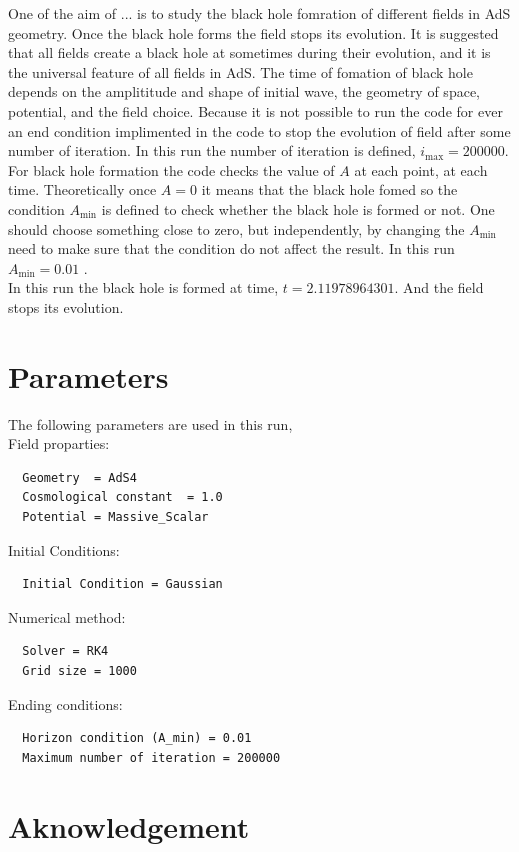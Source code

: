 \documentclass[12pt]{article}
\begin{document}
One of the aim of ... is to study the black hole fomration of different fields in AdS geometry. Once the black hole forms the field stops its evolution. It is suggested that all fields create a black hole at sometimes during their evolution, and it is the universal feature of all fields in AdS. The time of fomation of black hole depends on the amplititude and shape of initial wave, the geometry of space, potential, and the field choice. Because it is not possible to run the code for ever an end condition implimented in the code to stop the evolution of field after some number of iteration. In this run the number of iteration is defined, $i_{\max}  = 200000$. \\
For black hole formation the code checks the value of $A$ at each point, at each time. Theoretically once $A = 0$ it means that the black hole fomed so the condition $A_{\min}$ is defined to check whether the black hole is formed or not. One should choose something close to zero, but independently, by changing the $A_{\min}$ need to make sure that the condition do not affect the result. In this run $A_{\min} = 0.01$ . \\
 In this run the black hole is formed at time, $ t = 2.11978964301$. And the field stops its evolution. 
\section{Parameters}

The following parameters are used in this run, \\

Field proparties:
\begin{verbatim}
  Geometry  = AdS4
  Cosmological constant  = 1.0
  Potential = Massive_Scalar
\end{verbatim}

Initial Conditions:
\begin{verbatim}
  Initial Condition = Gaussian
\end{verbatim}

Numerical method:
\begin{verbatim}
  Solver = RK4
  Grid size = 1000
\end{verbatim}

Ending conditions:
\begin{verbatim}
  Horizon condition (A_min) = 0.01
  Maximum number of iteration = 200000
\end{verbatim}

\section*{Aknowledgement}
 
 
\end{document}
